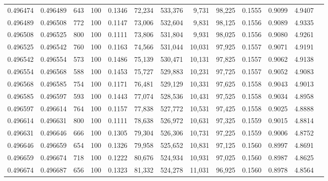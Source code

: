 \begin{tabular}{rrrrrrrrrrrrr}
0.496474 & 0.496489 &   643 & 100 &                                     0.1346 &  72,234 & 533,376 &   9,731 &  98,225 & 0.1555 & 0.9099 & 4.9407 \\
0.496489 & 0.496508 &   772 & 100 &                                     0.1147 &  73,006 & 532,604 &   9,831 &  98,125 & 0.1556 & 0.9089 & 4.9335 \\
0.496508 & 0.496525 &   800 & 100 &                                     0.1111 &  73,806 & 531,804 &   9,931 &  98,025 & 0.1556 & 0.9080 & 4.9261 \\
0.496525 & 0.496542 &   760 & 100 &                                     0.1163 &  74,566 & 531,044 &  10,031 &  97,925 & 0.1557 & 0.9071 & 4.9191 \\
0.496542 & 0.496554 &   573 & 100 &                                     0.1486 &  75,139 & 530,471 &  10,131 &  97,825 & 0.1557 & 0.9062 & 4.9138 \\
0.496554 & 0.496568 &   588 & 100 &                                     0.1453 &  75,727 & 529,883 &  10,231 &  97,725 & 0.1557 & 0.9052 & 4.9083 \\
0.496568 & 0.496585 &   754 & 100 &                                     0.1171 &  76,481 & 529,129 &  10,331 &  97,625 & 0.1558 & 0.9043 & 4.9013 \\
0.496585 & 0.496597 &   593 & 100 &                                     0.1443 &  77,074 & 528,536 &  10,431 &  97,525 & 0.1558 & 0.9034 & 4.8958 \\
0.496597 & 0.496614 &   764 & 100 &                                     0.1157 &  77,838 & 527,772 &  10,531 &  97,425 & 0.1558 & 0.9025 & 4.8888 \\
0.496614 & 0.496631 &   800 & 100 &                                     0.1111 &  78,638 & 526,972 &  10,631 &  97,325 & 0.1559 & 0.9015 & 4.8814 \\
0.496631 & 0.496646 &   666 & 100 &                                     0.1305 &  79,304 & 526,306 &  10,731 &  97,225 & 0.1559 & 0.9006 & 4.8752 \\
0.496646 & 0.496659 &   654 & 100 &                                     0.1326 &  79,958 & 525,652 &  10,831 &  97,125 & 0.1560 & 0.8997 & 4.8691 \\
0.496659 & 0.496674 &   718 & 100 &                                     0.1222 &  80,676 & 524,934 &  10,931 &  97,025 & 0.1560 & 0.8987 & 4.8625 \\
0.496674 & 0.496687 &   656 & 100 &                                     0.1323 &  81,332 & 524,278 &  11,031 &  96,925 & 0.1560 & 0.8978 & 4.8564 \\

\end{tabular}
